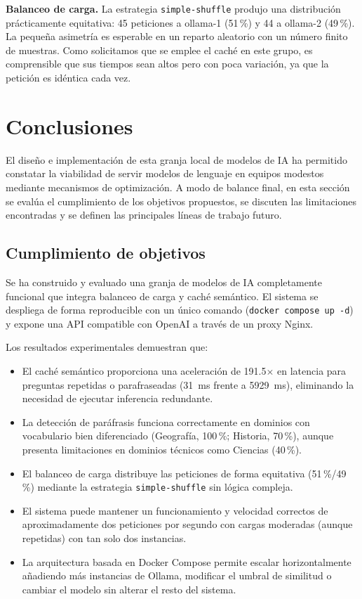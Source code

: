 \textbf{Balanceo de carga.} La estrategia \texttt{simple-shuffle} produjo una distribución prácticamente equitativa: 45 peticiones a ollama-1 (51\,\%) y 44 a ollama-2 (49\,\%). La pequeña asimetría es esperable en un reparto aleatorio con un número finito de muestras. Como solicitamos que se emplee el caché en este grupo, es comprensible que sus tiempos sean altos pero con poca variación, ya que la petición es idéntica cada vez.

\newpage
\section{Conclusiones}

El diseño e implementación de esta granja local de modelos de IA ha permitido constatar la viabilidad de servir modelos de lenguaje en equipos modestos mediante mecanismos de optimización. A modo de balance final, en esta sección se evalúa el cumplimiento de los objetivos propuestos, se discuten las limitaciones encontradas y se definen las principales líneas de trabajo futuro.

\subsection{Cumplimiento de objetivos}

Se ha construido y evaluado una granja de modelos de IA completamente funcional que integra balanceo de carga y caché semántico. El sistema se despliega de forma reproducible con un único comando (\texttt{docker compose up -d}) y expone una API compatible con OpenAI a través de un proxy Nginx.

Los resultados experimentales demuestran que:

\begin{itemize}
    \item El caché semántico proporciona una aceleración de 191.5$\times$ en latencia para preguntas repetidas o parafraseadas (31~ms frente a 5929~ms), eliminando la necesidad de ejecutar inferencia redundante.
    
    \item La detección de paráfrasis funciona correctamente en dominios con vocabulario bien diferenciado (Geografía, 100\,\%; Historia, 70\,\%), aunque presenta limitaciones en dominios técnicos como Ciencias (40\,\%).
    
    \item El balanceo de carga distribuye las peticiones de forma equitativa (51\,\%/49\,\%) mediante la estrategia \texttt{simple\allowbreak-shuffle} sin lógica compleja.
    
    \item El sistema puede mantener un funcionamiento y velocidad correctos de aproximadamente dos peticiones por segundo con cargas moderadas (aunque repetidas) con tan solo dos instancias.
    
    \item La arquitectura basada en Docker Compose permite escalar horizontalmente añadiendo más instancias de Ollama, modificar el umbral de similitud o cambiar el modelo sin alterar el resto del sistema.
\end{itemize}

